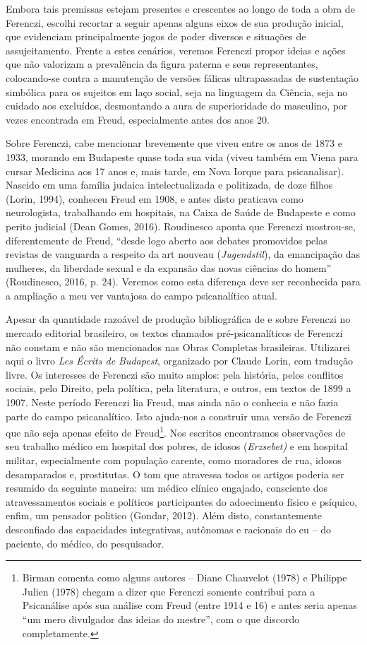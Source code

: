 Embora tais premissas estejam presentes e crescentes ao longo de toda a
obra de Ferenczi, escolhi recortar a seguir apenas alguns eixos de sua
produção inicial, que evidenciam principalmente jogos de poder diversos
e situações de assujeitamento. Frente a estes cenários, veremos Ferenczi
propor ideias e ações que não valorizam a prevalência da figura paterna
e seus representantes, colocando-se contra a manutenção de versões
fálicas ultrapassadas de sustentação simbólica para os sujeitos em laço
social, seja na linguagem da Ciência, seja no cuidado aos excluídos,
desmontando a aura de superioridade do masculino, por vezes encontrada
em Freud, especialmente antes dos anos 20.

Sobre Ferenczi, cabe mencionar brevemente que viveu entre os anos de
1873 e 1933, morando em Budapeste quase toda sua vida (viveu também em
Viena para cursar Medicina aos 17 anos e, mais tarde, em Nova Iorque
para psicanalisar). Nascido em uma família judaica intelectualizada e
politizada, de doze filhos (Lorin, 1994), conheceu Freud em 1908, e
antes disto praticava como neurologista, trabalhando em hospitais, na
Caixa de Saúde de Budapeste e como perito judicial (Dean Gomes, 2016).
Roudinesco aponta que Ferenczi mostrou-se, diferentemente de Freud,
``desde logo aberto aos debates promovidos pelas revistas de vanguarda a
respeito da art nouveau (\emph{Jugendstil}), da emancipação das
mulheres, da liberdade sexual e da expansão das novas ciências do
homem'' (Roudinesco, 2016, p. 24). Veremos como esta diferença deve ser
reconhecida para a ampliação a meu ver vantajosa do campo psicanalítico
atual.

Apesar da quantidade razoável de produção bibliográfica de e sobre
Ferenczi no mercado editorial brasileiro, os textos chamados
pré-psicanalíticos de Ferenczi não constam e não são mencionados nas
Obras Completas brasileiras. Utilizarei aqui o livro \emph{Les Écrits de
Budapest}, organizado por Claude Lorin, com tradução livre. Os
interesses de Ferenczi são muito amplos: pela história, pelos conflitos
sociais, pelo Direito, pela política, pela literatura, e outros, em
textos de 1899 a 1907. Neste período Ferenczi lia Freud, mas ainda não o
conhecia e não fazia parte do campo psicanalítico. Isto ajuda-nos a
construir uma versão de Ferenczi que não seja apenas efeito de
Freud\footnote{Birman comenta como alguns autores -- Diane Chauvelot
  (1978) e Philippe Julien (1978) chegam a dizer que Ferenczi somente
  contribui para a Psicanálise após sua análise com Freud (entre 1914 e
  16) e antes seria apenas ``um mero divulgador das ideias do mestre'',
  com o que discordo completamente.}. Nos escritos encontramos
observações de seu trabalho médico em hospital dos pobres, de idosos
(\emph{Erzsebet)} e em hospital militar, especialmente com população
carente, como moradores de rua, idosos desamparados e, prostitutas. O
tom que atravessa todos os artigos poderia ser resumido da seguinte
maneira: um médico clínico engajado, consciente dos atravessamentos
sociais e políticos participantes do adoecimento físico e psíquico,
enfim, um pensador politico (Gondar, 2012). Além disto, constantemente
desconfiado das capacidades integrativas, autônomas e racionais do eu --
do paciente, do médico, do pesquisador.

